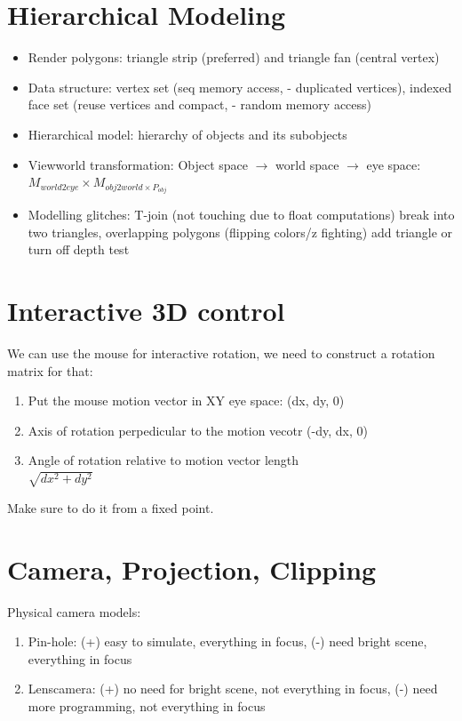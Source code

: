 \documentclass[a4paper]{article}
\begin{document}
\section{Hierarchical Modeling }
\begin{itemize}
	\item Render polygons: triangle strip (preferred) and triangle fan (central vertex)
	\item Data structure: vertex set (seq memory access, - duplicated vertices), indexed face set (reuse vertices and compact, - random memory access)
	\item Hierarchical model: hierarchy of objects and its subobjects
	\item Viewworld transformation: Object space $\to$ world space $\to$ eye space: $M_{world2eye}\times M_{obj2world\times P_{obj}}$ 
	\item Modelling glitches: T-join (not touching due to float computations) break into two triangles, overlapping polygons (flipping colors/z fighting) add triangle or turn off depth test  
\end{itemize}

\section{Interactive 3D control}
We can use the mouse for interactive rotation, we need to construct a rotation matrix for that:
\begin{enumerate}
	\item Put the mouse motion vector in XY eye space: (dx, dy, 0)
	\item Axis of rotation perpedicular to the motion vecotr (-dy, dx, 0)
	\item Angle of rotation relative to motion vector length \\ $\sqrt{dx^2 + dy^2}$ 
\end{enumerate}

Make sure to do it from a fixed point.


\section{Camera, Projection, Clipping}
Physical camera models:
\begin{enumerate}
	\item Pin-hole: (+) easy to simulate, everything in focus, (-) need bright scene, everything in focus
	\item Lenscamera: (+) no need for bright scene, not everything in focus, (-) need more programming, not everything in focus
\end{enumerate}
\end{document}
